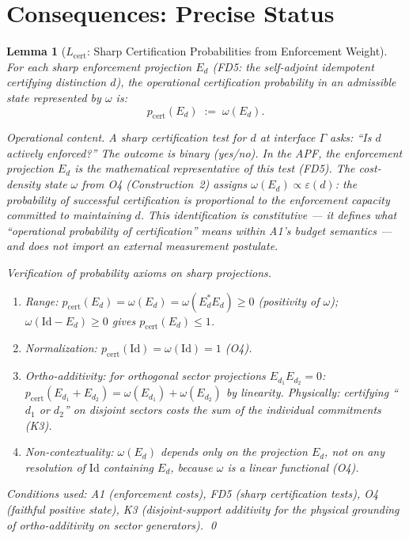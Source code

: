 \documentclass[11pt,a4paper]{article}
\newtheorem{lemma}[theorem]{Lemma}
\theoremstyle{definition}
\newcommand{\eps}{\varepsilon}
\begin{document}
\section{Consequences: Precise Status}
\label{sec:consequences}

\begin{lemma}[$L_{\mathrm{cert}}$: Sharp Certification Probabilities from Enforcement Weight]\label{lem:Lcert}
For each sharp enforcement projection $E_d$ (FD5: the self-adjoint idempotent certifying distinction $d$), the \emph{operational certification probability} in an admissible state represented by $\omega$ is:
\[
p_{\mathrm{cert}}(E_d) \;:=\; \omega(E_d).
\]

\smallskip\noindent\textit{Operational content.}  A sharp certification test for $d$ at interface $\Gamma$ asks: ``Is $d$ actively enforced?''  The outcome is binary (yes/no).  In the APF, the enforcement projection $E_d$ is the mathematical representative of this test (FD5).  The cost-density state $\omega$ from O4 (Construction~2) assigns $\omega(E_d) \propto \eps(d)$: the probability of successful certification is proportional to the enforcement capacity committed to maintaining $d$.  This identification is constitutive --- it defines what ``operational probability of certification'' means within A1's budget semantics --- and does not import an external measurement postulate.

\smallskip\noindent\textit{Verification of probability axioms on sharp projections.}
\begin{enumerate}[nosep,label=(\roman*),leftmargin=2em]
\item \textit{Range:} $p_{\mathrm{cert}}(E_d) = \omega(E_d) = \omega(E_d^* E_d) \ge 0$ (positivity of $\omega$); $\omega(\mathrm{Id} - E_d) \ge 0$ gives $p_{\mathrm{cert}}(E_d) \le 1$.
\item \textit{Normalization:} $p_{\mathrm{cert}}(\mathrm{Id}) = \omega(\mathrm{Id}) = 1$ (O4).
\item \textit{Ortho-additivity:} for orthogonal sector projections $E_{d_1} E_{d_2} = 0$: $p_{\mathrm{cert}}(E_{d_1} + E_{d_2}) = \omega(E_{d_1}) + \omega(E_{d_2})$ by linearity.  Physically: certifying ``$d_1$ or $d_2$'' on disjoint sectors costs the sum of the individual commitments (K3).
\item \textit{Non-contextuality:} $\omega(E_d)$ depends only on the projection $E_d$, not on any resolution of $\mathrm{Id}$ containing $E_d$, because $\omega$ is a linear functional (O4).
\end{enumerate}
\textit{Conditions used:} A1 (enforcement costs), FD5 (sharp certification tests), O4 (faithful positive state), K3 (disjoint-support additivity for the physical grounding of ortho-additivity on sector generators).  \qed
\end{lemma}
\end{document}
